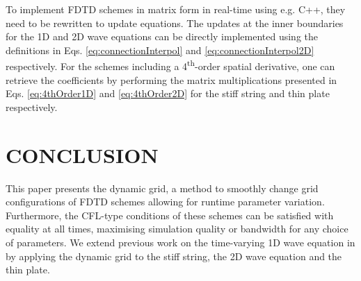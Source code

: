 \documentclass[fleqn]{jaes}
\def\SWcomment[#1]{\textcolor{blue}{#1}}
\begin{document}



To implement FDTD schemes in matrix form in real-time using e.g. C++, they need to be rewritten to update equations. The updates at the inner boundaries for the 1D and 2D wave equations can be directly implemented using the definitions in Eqs. \eqref{eq:connectionInterpol} and \eqref{eq:connectionInterpol2D} respectively. For the schemes including a 4\textsuperscript{th}-order spatial derivative, one can retrieve the coefficients by performing the matrix multiplications presented in Eqs. \eqref{eq:4thOrder1D} and \eqref{eq:4thOrder2D} for the stiff string and thin plate respectively. 





\section{CONCLUSION}\label{sec:conclusion}
This paper presents the dynamic grid, a method to smoothly change grid configurations of FDTD schemes allowing for runtime parameter variation. Furthermore, the CFL-type conditions of these schemes can be satisfied with equality at all times, maximising simulation quality or bandwidth for any choice of parameters. We extend previous work on the time-varying 1D wave equation in \cite{Willemsen2021a} by applying the dynamic grid to the stiff string, the 2D wave equation and the thin plate. 
%
\end{document}
